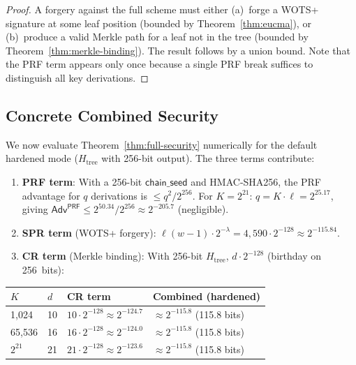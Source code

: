 \documentclass[11pt,a4paper]{article}
\theoremstyle{definition}
\begin{document}
\begin{proof}
A forgery against the full scheme must either (a)~forge a WOTS+ signature at some leaf position (bounded by Theorem~\ref{thm:eucma}), or (b)~produce a valid Merkle path for a leaf not in the tree (bounded by Theorem~\ref{thm:merkle-binding}). The result follows by a union bound. Note that the PRF term appears only once because a single PRF break suffices to distinguish all key derivations.
\end{proof}

\subsection{Concrete Combined Security}
\label{sec:combined-security}

We now evaluate Theorem~\ref{thm:full-security} numerically for the default hardened mode ($H_{\mathrm{tree}}$ with 256-bit output). The three terms contribute:

\begin{enumerate}[nosep]
\item \textbf{PRF term}: With a 256-bit $\mathsf{chain\_seed}$ and HMAC-SHA256, the PRF advantage for $q$ derivations is $\leq q^2 / 2^{256}$. For $K = 2^{21}$: $q = K \cdot \ell = 2^{25.17}$, giving $\mathsf{Adv}^{\mathsf{PRF}} \leq 2^{50.34} / 2^{256} \approx 2^{-205.7}$ (negligible).
\item \textbf{SPR term} (WOTS+ forgery): $\ell(w-1) \cdot 2^{-\lambda} = 4{,}590 \cdot 2^{-128} \approx 2^{-115.84}$.
\item \textbf{CR term} (Merkle binding): With 256-bit $H_{\mathrm{tree}}$, $d \cdot 2^{-128}$ (birthday on 256~bits):
\end{enumerate}

\begin{center}
\begin{tabular}{@{}llll@{}}
\toprule
$K$ & $d$ & CR term & \textbf{Combined (hardened)} \\
\midrule
1,024 & 10 & $10 \cdot 2^{-128} \approx 2^{-124.7}$ & $\approx 2^{-115.8}$ (115.8 bits) \\
65,536 & 16 & $16 \cdot 2^{-128} \approx 2^{-124.0}$ & $\approx 2^{-115.8}$ (115.8 bits) \\
$2^{21}$ & 21 & $21 \cdot 2^{-128} \approx 2^{-123.6}$ & $\approx 2^{-115.8}$ (115.8 bits) \\
\bottomrule
\end{tabular}
\end{center}
\end{document}

